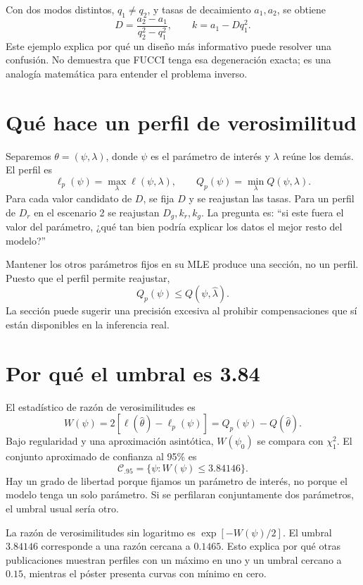 \documentclass[11pt,a4paper]{report}
\begin{document}
Con dos modos distintos, $q_1\ne q_2$, y tasas de decaimiento $a_1,a_2$, se obtiene
\[
D=\frac{a_2-a_1}{q_2^2-q_1^2},\qquad k=a_1-Dq_1^2.
\]
Este ejemplo explica por qué un diseño más informativo puede resolver una confusión. No demuestra que FUCCI tenga esa degeneración exacta; es una analogía matemática para entender el problema inverso.

\section{Qué hace un perfil de verosimilitud}
Separemos $\theta=(\psi,\lambda)$, donde $\psi$ es el parámetro de interés y $\lambda$ reúne los demás. El perfil es
\[
\ell_p(\psi)=\max_\lambda\ell(\psi,\lambda),\qquad
Q_p(\psi)=\min_\lambda Q(\psi,\lambda).
\]
Para cada valor candidato de $D$, se fija $D$ y se reajustan las tasas. Para un perfil de $D_r$ en el escenario 2 se reajustan $D_g,k_r,k_g$. La pregunta es: ``si este fuera el valor del parámetro, ¿qué tan bien podría explicar los datos el mejor resto del modelo?''

Mantener los otros parámetros fijos en su MLE produce una sección, no un perfil. Puesto que el perfil permite reajustar,
\[
Q_p(\psi)\le Q(\psi,\widehat\lambda).
\]
La sección puede sugerir una precisión excesiva al prohibir compensaciones que sí están disponibles en la inferencia real.

\section{Por qué el umbral es 3.84}
El estadístico de razón de verosimilitudes es
\begin{equation}
W(\psi)=2[\ell(\widehat\theta)-\ell_p(\psi)]
=Q_p(\psi)-Q(\widehat\theta).
\end{equation}
Bajo regularidad y una aproximación asintótica, $W(\psi_0)$ se compara con $\chi_1^2$. El conjunto aproximado de confianza al 95\% es
\begin{equation}
\mathcal C_{.95}=\{\psi:W(\psi)\le3.84146\}.
\end{equation}
Hay un grado de libertad porque fijamos un parámetro de interés, no porque el modelo tenga un solo parámetro. Si se perfilaran conjuntamente dos parámetros, el umbral usual sería otro.

La razón de verosimilitudes sin logaritmo es $\exp[-W(\psi)/2]$. El umbral $3.84146$ corresponde a una razón cercana a $0.1465$. Esto explica por qué otras publicaciones muestran perfiles con un máximo en uno y un umbral cercano a $0.15$, mientras el póster presenta curvas con mínimo en cero.
\end{document}

